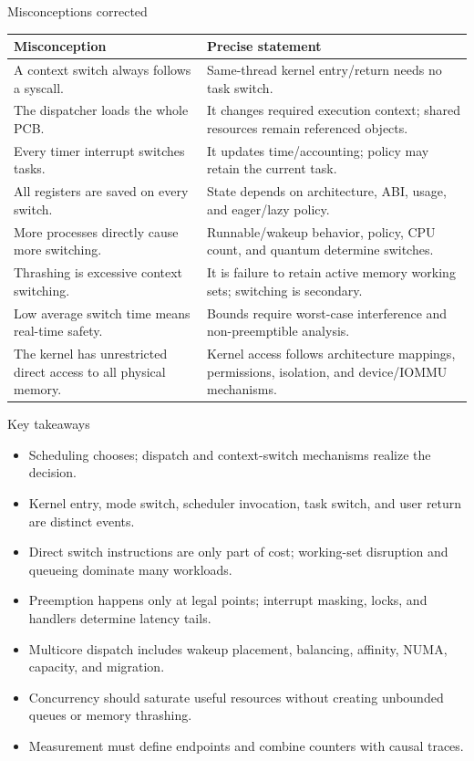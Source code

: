 \documentclass[aspectratio=169,11pt]{beamer}
\begin{document}
\begin{frame}{Misconceptions corrected}
  \scriptsize
  \begin{tabularx}{\textwidth}{@{}X@{\quad$\Rightarrow$\quad}X@{}}
    \toprule
    \textbf{Misconception} & \textbf{Precise statement} \\
    \midrule
    A context switch always follows a syscall. & Same-thread kernel entry/return needs no task switch. \\
    The dispatcher loads the whole PCB. & It changes required execution context; shared resources remain referenced objects. \\
    Every timer interrupt switches tasks. & It updates time/accounting; policy may retain the current task. \\
    All registers are saved on every switch. & State depends on architecture, ABI, usage, and eager/lazy policy. \\
    More processes directly cause more switching. & Runnable/wakeup behavior, policy, CPU count, and quantum determine switches. \\
    Thrashing is excessive context switching. & It is failure to retain active memory working sets; switching is secondary. \\
    Low average switch time means real-time safety. & Bounds require worst-case interference and non-preemptible analysis. \\
    The kernel has unrestricted direct access to all physical memory. & Kernel access follows architecture mappings, permissions, isolation, and device/IOMMU mechanisms. \\
    \bottomrule
  \end{tabularx}
\end{frame}

\begin{frame}{Key takeaways}
  \begin{itemize}
    \item Scheduling chooses; dispatch and context-switch mechanisms realize the decision.
    \item Kernel entry, mode switch, scheduler invocation, task switch, and user return are distinct events.
    \item Direct switch instructions are only part of cost; working-set disruption and queueing dominate many workloads.
    \item Preemption happens only at legal points; interrupt masking, locks, and handlers determine latency tails.
    \item Multicore dispatch includes wakeup placement, balancing, affinity, NUMA, capacity, and migration.
    \item Concurrency should saturate useful resources without creating unbounded queues or memory thrashing.
    \item Measurement must define endpoints and combine counters with causal traces.
  \end{itemize}
\end{frame}
\end{document}

